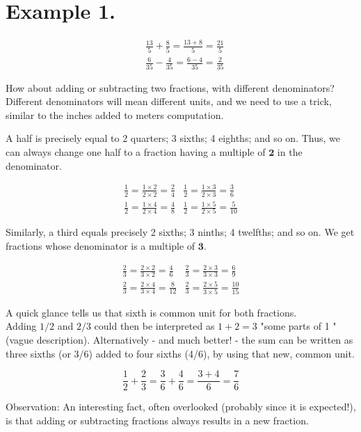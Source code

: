 \documentclass{ximera}
\begin{document}
\section*{Example 1.}
$$\begin{aligned}
& \frac{13}{5}+\frac{8}{5}=\frac{13+8}{5}=\frac{21}{5} \\
& \frac{6}{35}-\frac{4}{35}=\frac{6-4}{35}=\frac{2}{35}
\end{aligned}$$

How about adding or subtracting two fractions, with different denominators? Different denominators will mean different units, and we need to use a trick, similar to the inches added to meters computation.

A half is precisely equal to 2 quarters; 3 sixths; 4 eighths; and so on. Thus, we can always change one half to a fraction having a multiple of $\mathbf{2}$ in the denominator.

$$\begin{array}{ll}
\frac{1}{2}=\frac{1 \times 2}{2 \times 2}=\frac{2}{4} & \frac{1}{2}=\frac{1 \times 3}{2 \times 3}=\frac{3}{6} \\
\frac{1}{2}=\frac{1 \times 4}{2 \times 4}=\frac{4}{8} & \frac{1}{2}=\frac{1 \times 5}{2 \times 5}=\frac{5}{10}
\end{array}$$

Similarly, a third equals precisely 2 sixths; 3 ninths; 4 twelfths; and so on. We get fractions whose denominator is a multiple of $\mathbf{3}$.

$$\begin{array}{ll}
\frac{2}{3}=\frac{2 \times 2}{3 \times 2}=\frac{4}{6} & \frac{2}{3}=\frac{2 \times 3}{3 \times 3}=\frac{6}{9} \\
\frac{2}{3}=\frac{2 \times 4}{3 \times 4}=\frac{8}{12} & \frac{2}{3}=\frac{2 \times 5}{3 \times 5}=\frac{10}{15}
\end{array}$$

A quick glance tells us that sixth is common unit for both fractions.\\
Adding $1 / 2$ and $2 / 3$ could then be interpreted as $1+2=3$ "some parts of 1 " (vague description). Alternatively - and much better! - the sum can be written as three sixths (or 3/6) added to four sixths (4/6), by using that new, common unit.

$$\frac{1}{2}+\frac{2}{3}=\frac{3}{6}+\frac{4}{6}=\frac{3+4}{6}=\frac{7}{6}$$

Observation: An interesting fact, often overlooked (probably since it is expected!), is that adding or subtracting fractions always results in a new fraction.
\end{document}
